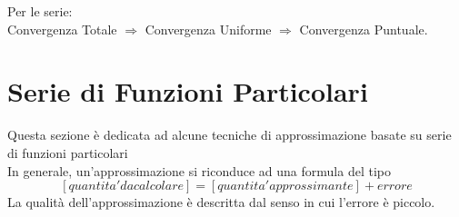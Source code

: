 \observation
Per le serie:\\
Convergenza Totale $\Rightarrow$ Convergenza Uniforme $\Rightarrow$ Convergenza Puntuale.

\section{Serie di Funzioni Particolari}
Questa sezione è dedicata ad alcune tecniche di approssimazione  basate su serie di funzioni particolari\\
In generale, un'approssimazione si riconduce ad una formula del tipo\\
$$\left[quantita' da calcolare \right]=\left[ quantita' approssimante \right]+ errore$$
La qualità dell'approssimazione è descritta dal senso in cui l'errore è piccolo.\\
